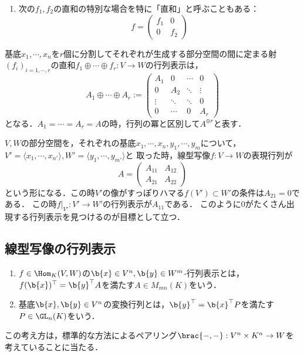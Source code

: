 \documentclass[uplatex, dvipdfmx]{jsreport}
\begin{document}
\begin{definition}[線型写像の直和]
\begin{enumerate}
        \item 次の$f_1,f_2$の直和の特別な場合を特に「直和」と呼ぶこともある：
        \[ f=\begin{pmatrix}f_{1}&0\\0&f_{2}\end{pmatrix} \]
    \end{enumerate}
\end{definition}

\begin{definition}[行列の直和]
    基底$x_1,\cdots,x_n$を$r$個に分割してそれぞれが生成する部分空間の間に定まる射$(f_i)_{i=1,\cdots,r}$の直和$f_1\oplus\cdots\oplus f_r:V\to W$の行列表示は，
    \[ A_1\oplus\cdots\oplus A_r:=\begin{pmatrix}A_1&0&\cdots&0\\0&A_2&\ddots&\vdots\\\vdots&\ddots&\ddots&0\\0&\cdots&0&A_r\end{pmatrix} \]
    となる．$A_1=\cdots=A_r=A$の時，行列の冪と区別して$A^{\oplus r}$と表す．
\end{definition}

\begin{example}[部分空間と行列表示]
    $V,W$の部分空間を，それぞれの基底$x_1,\cdots,x_n,y_1,\cdots,y_m$について，$V'=\langle x_1,\cdots,x_{n'}\rangle,W'=\langle y_1,\cdots,y_{m'}\rangle$と
    取った時，線型写像$f:V\to W$の表現行列が
    \[ A=\begin{pmatrix}A_{11}&A_{12}\\A_{21}&A_{22}\end{pmatrix} \]
    という形になる．この時$V'$の像がすっぽりハマる$f(V')\subset W'$の条件は$A_{21}=0$である．
    この時$f|_{V'}:V'\to W'$の行列表示が$A_{11}$である．
    このように$0$がたくさん出現する行列表示を見つけるのが目標として立つ．
\end{example}

\subsection{線型写像の行列表示}

\begin{tcolorbox}[colframe=ForestGreen, colback=ForestGreen!10!white,breakable,colbacktitle=ForestGreen!40!white,coltitle=black,fonttitle=\bfseries\sffamily,
title=]
    \begin{enumerate}
        \item $f\in\Hom_K(V,W)$の$\b{x}\in V^n,\b{y}\in W^m$-行列表示とは，$f(\b{x})^\top=\b{y}^\top A$を満たす$A\in M_{mn}(K)$をいう．
        \item 基底$\b{x},\b{y}\in V^n$の変換行列とは，$\b{y}^\top=\b{x}^\top P$を満たす$P\in\GL_n(K)$をいう．
    \end{enumerate}
    この考え方は，標準的な方法によるペアリング$\brac{-,-}:V^n\times K^n\to W$を考えていることに当たる．
\end{tcolorbox}
\end{document}
